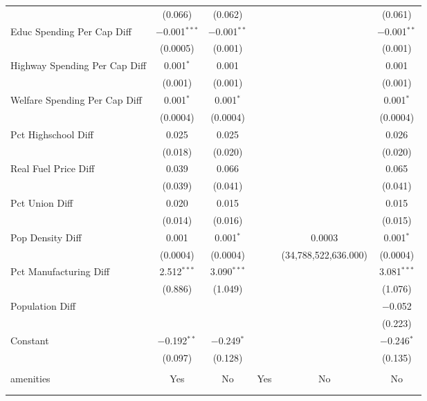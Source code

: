 \begin{table}[!htbp]
\begin{tabular}{@{\extracolsep{5pt}}lccccc}
  & (0.066) & (0.062) &  &  & (0.061) \\ 
  Educ Spending Per Cap Diff & $-$0.001$^{***}$ & $-$0.001$^{**}$ &  &  & $-$0.001$^{**}$ \\ 
  & (0.0005) & (0.001) &  &  & (0.001) \\ 
  Highway Spending Per Cap Diff & 0.001$^{*}$ & 0.001 &  &  & 0.001 \\ 
  & (0.001) & (0.001) &  &  & (0.001) \\ 
  Welfare Spending Per Cap Diff & 0.001$^{*}$ & 0.001$^{*}$ &  &  & 0.001$^{*}$ \\ 
  & (0.0004) & (0.0004) &  &  & (0.0004) \\ 
  Pct Highschool Diff & 0.025 & 0.025 &  &  & 0.026 \\ 
  & (0.018) & (0.020) &  &  & (0.020) \\ 
  Real Fuel Price Diff & 0.039 & 0.066 &  &  & 0.065 \\ 
  & (0.039) & (0.041) &  &  & (0.041) \\ 
  Pct Union Diff & 0.020 & 0.015 &  &  & 0.015 \\ 
  & (0.014) & (0.016) &  &  & (0.015) \\ 
  Pop Density Diff & 0.001 & 0.001$^{*}$ &  & 0.0003 & 0.001$^{*}$ \\ 
  & (0.0004) & (0.0004) &  & (34,788,522,636.000) & (0.0004) \\ 
  Pct Manufacturing Diff & 2.512$^{***}$ & 3.090$^{***}$ &  &  & 3.081$^{***}$ \\ 
  & (0.886) & (1.049) &  &  & (1.076) \\ 
  Population Diff &  &  &  &  & $-$0.052 \\ 
  &  &  &  &  & (0.223) \\ 
  Constant & $-$0.192$^{**}$ & $-$0.249$^{*}$ &  &  & $-$0.246$^{*}$ \\ 
  & (0.097) & (0.128) &  &  & (0.135) \\ 
 \hline \\[-1.8ex] 
amenities & Yes & No & Yes & No & No \\ 
\hline \\[-1.8ex] 
\hline 
\hline \\[-1.8ex] 
\end{tabular} 
\end{table} 
